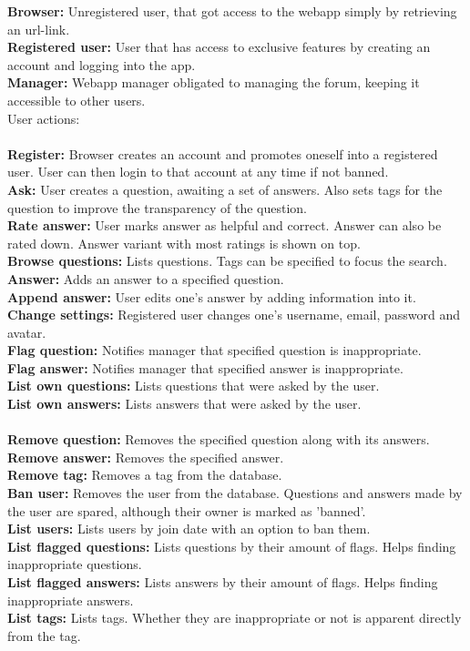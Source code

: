 \documentclass[a4paper,12pt]{article}
\begin{document}
\noindent \textbf{Browser:} Unregistered user, that got access to the webapp simply by retrieving an url-link.\\
\textbf{Registered user:} User that has access to exclusive features by creating an account and logging into the app.\\
\textbf{Manager:} Webapp manager obligated to managing the forum, keeping it accessible to other users.\\

\noindent User actions:\\
\\
\textbf{Register:} Browser creates an account and promotes oneself into a registered user. User can then login to that account at any time if not banned.\\
\textbf{Ask:} User creates a question, awaiting a set of answers. Also sets tags for the question to improve the transparency of the question.\\
\textbf{Rate answer:} User marks answer as helpful and correct. Answer can also be rated down. Answer variant with most ratings is shown on top.\\
\textbf{Browse questions:} Lists questions. Tags can be specified to focus the search.\\
\textbf{Answer:} Adds an answer to a specified question.\\
\textbf{Append answer:} User edits one's answer by adding information into it.\\
\textbf{Change settings:} Registered user changes one's username, email, password and avatar.\\
\textbf{Flag question:} Notifies manager that specified question is inappropriate.\\
\textbf{Flag answer:} Notifies manager that specified answer is inappropriate.\\
\textbf{List own questions:} Lists questions that were asked by the user.\\
\textbf{List own answers:} Lists answers that were asked by the user.\\
\\
\textbf{Remove question:} Removes the specified question along with its answers.\\
\textbf{Remove answer:} Removes the specified answer.\\
\textbf{Remove tag:} Removes a tag from the database.\\
\textbf{Ban user:} Removes the user from the database. Questions and answers made by the user are spared, although their owner is marked as 'banned'.\\
\textbf{List users:} Lists users by join date with an option to ban them.\\
\textbf{List flagged questions:} Lists questions by their amount of flags. Helps finding inappropriate questions.\\
\textbf{List flagged answers:} Lists answers by their amount of flags. Helps finding inappropriate answers.\\
\textbf{List tags:} Lists tags. Whether they are inappropriate or not is apparent directly from the tag.\\
\newpage
\end{document}
